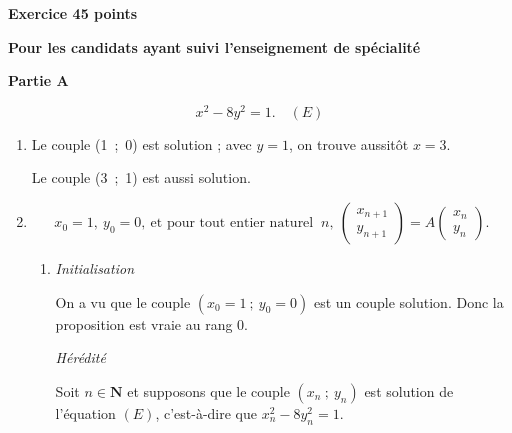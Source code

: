 \documentclass[10pt]{article}
\newcommand{\N}{\textbf{N}}
\begin{document}
\textbf{Exercice 4\hfill 5 points}

\textbf{Pour les candidats ayant suivi l'enseignement de spécialité}

\bigskip

\textbf{Partie A}



\[x^2 - 8y^2 = 1. \quad(E)\]

\medskip

\begin{enumerate}
\item %
Le couple (1~;~0) est solution ; avec $y = 1$, on trouve aussitôt $x = 3$.

Le couple (3~;~1) est aussi solution.
\item %


\[x_0 = 1,\: y_0 = 0,\: \text{et pour tout entier naturel }\:n,\: \begin{pmatrix}x_{n+1}\\y_{n+1}\end{pmatrix} = A\begin{pmatrix}x_{n}\\y_{n}\end{pmatrix}.\]
	\begin{enumerate}
		\item %

\emph{Initialisation}

On a vu  que le couple $\left(x_0 = 1~;~y_0 = 0 \right)$ est un couple solution. Donc la proposition est vraie au rang $0$.

\emph{Hérédité}

Soit $n \in \N$ et supposons que le couple $\left(x_n~;~y_n\right)$ est solution de l'équation $(E)$, c'est-à-dire que $x_n^2 - 8y_n^2 = 1$.


\end{enumerate}
\end{enumerate}
\end{document}
